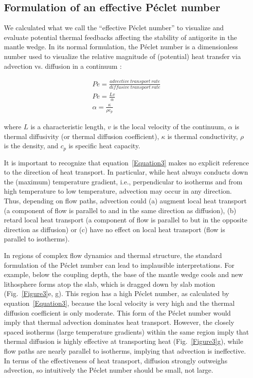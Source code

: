 \documentclass[draft]{assets/agujournal2019}
\begin{document}
\subsection{Formulation of an effective P\'{e}clet number}
We calculated what we call the “effective P\'{e}clet number” to visualize and evaluate potential thermal feedbacks affecting the stability of antigorite in the mantle wedge. In its normal formulation, the P\'{e}clet number is a dimensionless number used to visualize the relative magnitude of (potential) heat transfer via advection vs. diffusion in a continuum \cite{Patankar2018}:

\begin{equation}
 \begin{gathered}
  Pe=\frac{advective~transport~rate}{diffusive~transport~rate} \\
  Pe=\frac{Lv}{\alpha} \\
  \alpha=\frac{\kappa}{\rho c_p}
 \end{gathered}
 \label{Equation3}
\end{equation}

where $L$ is a characteristic length, $v$ is the local velocity of the continuum, $\alpha$ is thermal diffusivity (or thermal diffusion coefficient), $\kappa$ is thermal conductivity, $\rho$ is the density, and $c_p$ is specific heat capacity.

It is important to recognize that equation~\ref{Equation3} makes no explicit reference to the direction of heat transport. In particular, while heat always conducts down the (maximum) temperature gradient, i.e., perpendicular to isotherms and from high temperature to low temperature, advection may occur in any direction. Thus, depending on flow paths, advection could (a) augment local heat transport (a component of flow is parallel to and in the same direction as diffusion), (b) retard local heat transport (a component of flow is parallel to but in the opposite direction as diffusion) or (c) have no effect on local heat transport (flow is parallel to isotherms).

In regions of complex flow dynamics and thermal structure, the standard formulation of the P\'{e}clet number can lead to implausible interpretations. For example, below the coupling depth, the base of the mantle wedge cools and new lithosphere forms atop the slab, which is dragged down by slab motion (Fig.~\ref{Figure3}e, g). This region has a high P\'{e}clet number, as calculated by equation~\ref{Equation3}, because the local velocity is very high and the thermal diffusion coefficient is only moderate. This form of the P\'{e}clet number would imply that thermal advection dominates heat transport. However, the closely spaced isotherms (large temperature gradients) within the same region imply that thermal diffusion is highly effective at transporting heat (Fig.~\ref{Figure3}g), while flow paths are nearly parallel to isotherms, implying that advection is ineffective. In terms of the effectiveness of heat transport, diffusion strongly outweighs advection, so intuitively the P\'{e}clet number should be small, not large.
\end{document}
